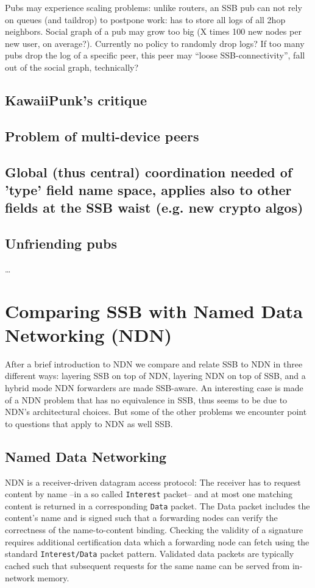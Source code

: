 \documentclass[sigconf]{acmart}
\begin{document}
Pubs may experience scaling problems: unlike routers, an SSB pub can
not rely on queues (and taildrop) to postpone work: has to store all
logs of all 2hop neighbors. Social graph of a pub may grow too big (X
times 100 new nodes per new user, on average?). Currently no policy to
randomly drop logs? If too many pubs drop the log of a specific peer,
this peer may ``loose SSB-connectivity'', fall out of the social
graph, technically?

\subsection{KawaiiPunk's critique}

\subsection{Problem of multi-device peers}

\subsection{Global (thus central) coordination needed of 'type' field
  name space, applies also  to other fields at the SSB waist (e.g. new
  crypto algos)}

\subsection{Unfriending pubs}
\ldots

\section{Comparing SSB with Named Data Networking (NDN)}

After a brief introduction to NDN we compare and relate SSB to NDN in
three different ways: layering SSB on top of NDN, layering NDN on top
of SSB, and a hybrid mode NDN forwarders are made SSB-aware. An
interesting case is made of a NDN problem that has no equivalence in
SSB, thus seems to be due to NDN's architectural choices. But some of
the other problems we encounter point to questions that apply to NDN
as well SSB.

\subsection{Named Data Networking}

NDN is a receiver-driven datagram access protocol: The receiver has to
request content by name --in a so called {\tt Interest} packet-- and
at most one matching content is returned in a corresponding {\tt Data}
packet. The Data packet includes the content's name and is signed such
that a forwarding nodes can verify the correctness of the
name-to-content binding. Checking the validity of a signature requires
additional certification data which a forwarding node can fetch using
the standard {\tt Interest/Data} packet pattern. Validated data
packets are typically cached such that subsequent requests for the
same name can be served from in-network memory.
\end{document}
